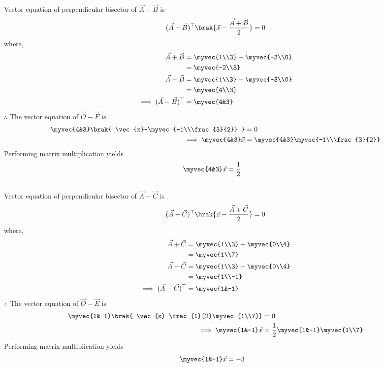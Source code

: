 \documentclass[11pt]{book}
\begin{document}
\begin{enumerate}[label=\thesection.\arabic*.,ref=\thesection.\theenumi]
Vector equation of perpendicular bisector of $\vec{A}-\vec{B}$ is
\begin{align}
 (\vec{A}-\vec{B})^\top  \brak{ \vec{x} - \frac{\vec{A}+\vec{B}}{2}} = 0
\end{align}
where,
\begin{align}
\vec{A}+\vec{B}&=\myvec{1\\3}+\myvec{-3\\0}\\
&=\myvec{-2\\3}\\
\vec{A}-\vec{B} &= \myvec{1\\3}-\myvec{-3\\0}\\
&=\myvec{4\\3}\\
\implies (\vec{A}-\vec{B})^\top &= \myvec{4&3}
\end{align}
$\therefore $ The vector equation of $\vec{O}-\vec{F}$ is
\begin{align}
\myvec{4&3} \brak{ \vec{x}-\myvec{-1\\\frac{3}{2}} }&=0\\
\implies \myvec{4&3}\vec{x}&=\myvec{4&3}\myvec{-1\\\frac{3}{2}}
\end{align}
Performing matrix multiplication yields
\begin{align}
\myvec{4&3}\vec{x}&=\frac{1}{2}
\end{align}\\
Vector equation of perpendicular bisector of $\vec{A}-\vec{C}$ is
\begin{align}
(\vec{A}-\vec{C})^\top\brak{ \vec{x} - \frac{\vec{A}+\vec{C}}{2}} = 0
\end{align}
where,
\begin{align}
\vec{A}+\vec{C}&=\myvec{1\\3}+\myvec{0\\4}\\
&=\myvec{1\\7}\\
\vec{A}-\vec{C} &= \myvec{1\\3}-\myvec{0\\4}\\
&=\myvec{1\\-1}\\
\implies (\vec{A}-\vec{C})^\top &= \myvec{1&-1}
\end{align}
$\therefore $ The vector equation of $\vec{O}-\vec{E}$ is
\begin{align}
\myvec{1&-1}\brak{ \vec{x}-\frac{1}{2}\myvec{1\\7}}&=0\\
\implies \myvec{1&-1}\vec{x}&=\frac{1}{2}\myvec{1&-1}\myvec{1\\7}
\end{align}
Performing matrix multiplication yields
\begin{align}
\myvec{1&-1}\vec{x}&=-3
\end{align}


\end{enumerate}
\end{document}

